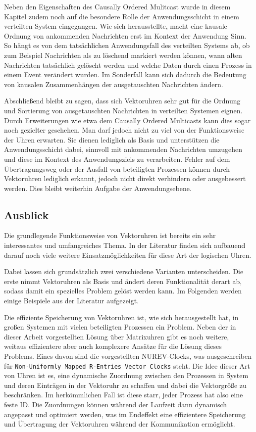 Neben den Eigenschaften des Causally Ordered Mulitcast wurde in diesem Kapitel zudem noch auf die besondere Rolle der Anwendungsschicht in einem verteilten System eingegangen. Wie sich herausstellte, macht eine kausale Ordnung von ankommenden Nachrichten erst im Kontext der Anwendung Sinn. So hängt es von dem tatsächlichen Anwendungsfall des verteilten Systems ab, ob zum Beispiel Nachrichten als zu löschend markiert werden können, wann alten Nachrichten tatsächlich gelöscht werden und welche Daten durch einen Prozess in einem Event verändert wurden. Im Sonderfall kann sich dadurch die Bedeutung von kausalen Zusammenhängen der ausgetauschten Nachrichten ändern.

Abschließend bleibt zu sagen, dass sich Vektoruhren sehr gut für die Ordnung und Sortierung von ausgetauschten Nachrichten in verteilten Systemen eignen. Durch Erweiterungen wie etwa dem Causally Ordered Multicasts kann dies sogar noch gezielter geschehen. Man darf jedoch nicht zu viel von der Funktionsweise der Uhren erwarten. Sie dienen lediglich als Basis und unterstützen die Anwendungsschicht dabei, sinnvoll mit ankommenden Nachrichten umzugehen und diese im Kontext des Anwendungsziels zu verarbeiten. Fehler auf dem Übertragungsweg oder der Ausfall von beteiligten Prozessen können durch Vektoruhren lediglich erkannt, jedoch nicht direkt verhindern oder ausgebessert werden. Dies bleibt weiterhin Aufgabe der Anwendungsebene.
\subsection{Ausblick}
Die grundlegende Funktionsweise von Vektoruhren ist bereits ein sehr interessantes und umfangreiches Thema. In der Literatur finden sich aufbauend darauf noch viele weitere Einsatzmöglichkeiten für diese Art der logischen Uhren.

Dabei lassen sich grundsätzlich zwei verschiedene Varianten unterscheiden. Die erste nimmt Vektoruhren als Basis und ändert deren Funktionalität derart ab, sodass damit ein spezielles Problem gelöst werden kann. Im Folgenden werden einige Beispiele aus der Literatur aufgezeigt.

Die effiziente Speicherung von Vektoruhren ist, wie sich herausgestellt hat, in großen Systemen mit vielen beteiligten Prozessen ein Problem. Neben der in dieser Arbeit vorgestellten Lösung über Matrixuhren gibt es noch weitere, weitaus effizientere aber auch komplexere Ansätze für die Lösung dieses Problems. Eines davon sind die \cite{Gidenstam2004} vorgestellten NUREV-Clocks, was ausgeschreiben für \texttt{Non-Uniformly Mapped R-Entries Vector Clocks} steht. Die Idee dieser Art von Uhren ist es, eine dynamische Zuordnung zwischen den Prozessen in System und deren Einträgen in der Vektoruhr zu schaffen und dabei die Vektorgröße zu beschränken. Im herkömmlichen Fall ist diese starr, jeder Prozess hat also eine feste ID. Die Zuordnungen können während der Laufzeit dann dynamisch angepasst und optimiert werden, was im Endeffekt eine effizientere Speicherung und Übertragung der Vektoruhren während der Kommunikation ermöglicht.

